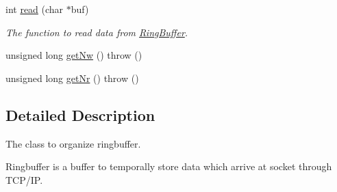 \begin{DoxyCompactItemize}
int \hyperlink{classLSTDAQ_1_1RingBuffer_a589fb1045d27590cca235e01f313d1e8}{read} (char $\ast$buf)
\begin{DoxyCompactList}\small\item\em The function to read data from \hyperlink{classLSTDAQ_1_1RingBuffer}{Ring\+Buffer}. \end{DoxyCompactList}\item 
unsigned long \hyperlink{classLSTDAQ_1_1RingBuffer_ac2bbd20a28f7dcf14388648f0eb092cd}{get\+Nw} ()  throw ()
\item 
unsigned long \hyperlink{classLSTDAQ_1_1RingBuffer_a9d7d68084f66a4fc1c6279171b778807}{get\+Nr} ()  throw ()
\end{DoxyCompactItemize}


\subsection{Detailed Description}
The class to organize ringbuffer. 

Ringbuffer is a buffer to temporally store data which arrive at socket through T\+C\+P/\+IP.


